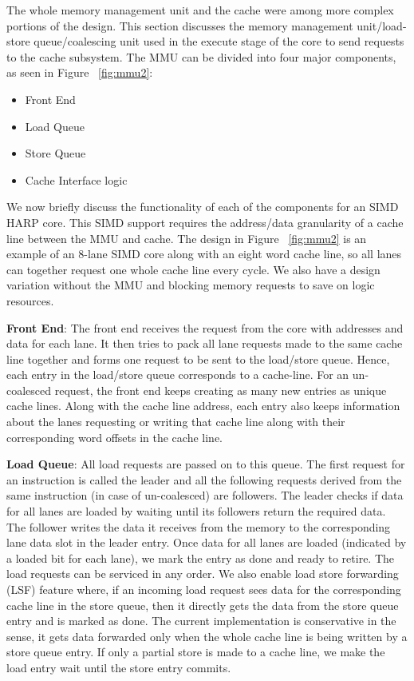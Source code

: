 The whole memory management unit and the cache were among more complex portions of the design. This section discusses the memory management unit/load-store queue/coalescing unit used in the execute stage of the core to send requests to the cache subsystem.  The MMU can be divided into four major components, as seen in Figure ~\ref{fig:mmu2}:

\begin{itemize}
\item Front End
\item Load Queue
\item Store Queue
\item Cache Interface logic
\end{itemize}

We now briefly discuss the functionality of each of the components for an SIMD HARP core. This SIMD support requires the address/data granularity of a cache line between the MMU and cache. 
The design in Figure ~\ref{fig:mmu2} is an example of an 8-lane SIMD core along with an eight word cache line, so all lanes can together request one whole cache line every cycle. We also have a design variation without the MMU and blocking memory requests to save on logic resources.


\noindent\textbf{Front End}: The front end receives the request from the core with addresses and data for each lane. It then tries to pack all lane requests made to the same cache line together and forms one request to be sent to the load/store queue. Hence, each entry in the load/store queue corresponds to a cache-line. For an un-coalesced request, the front end keeps creating as many new entries as unique cache lines. Along with the cache line address, each entry also keeps information about the lanes requesting or writing that cache line along with their corresponding word offsets in the cache line.

\noindent\textbf{Load Queue}: All load requests are passed on to this queue. The first request for an instruction is called the leader and all the following requests derived from the same instruction (in case of un-coalesced) are followers. The leader checks if data for all lanes are loaded by waiting until its followers return the required data. The follower writes the data it receives from the memory to the corresponding lane data slot in the leader entry. Once data for all lanes are loaded (indicated by a loaded bit for each lane), we mark the entry as done and ready to retire. The load requests can be serviced in any order. We also enable load store forwarding (LSF) feature where, if an incoming load request sees data for the corresponding cache line in the store queue, then it directly gets the data from the store queue entry and is marked as done. The current implementation is conservative in the sense, it gets data forwarded only when the whole cache line is being written by a store queue entry. If only a partial store is made to a cache line, we make the load entry wait until the store entry commits.

